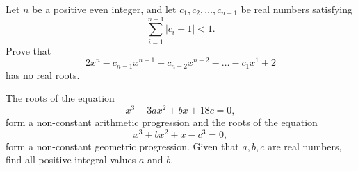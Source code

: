 \begin{question}[name={2014 USA TST}]
    Let $n$ be a positive even integer, and let $c_1, c_2, \dots, c_{n-1}$ be real numbers satisfying\[ \sum_{i=1}^{n-1} \left\lvert c_i-1 \right\rvert < 1. \] Prove that \[
	2x^n - c_{n-1}x^{n-1} + c_{n-2}x^{n-2} - \dots - c_1x^1 + 2\] has no real roots.
\end{question}


\begin{question}[name={2014 India Regional}]
The roots of the equation
\[ x^3-3ax^2+bx+18c=0, \]
form a non-constant arithmetic progression and the roots of the equation
\[ x^3+bx^2+x-c^3=0, \]
form a non-constant geometric progression. Given that $a,b,c$ are real numbers, find all positive integral values $a$ and $b$.
\end{question}
